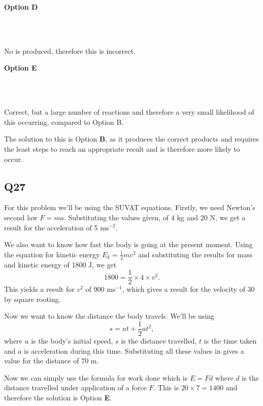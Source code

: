 \documentclass[11pt]{article}
\begin{document}
\textbf{Option D}

\\
\\

No  is produced, therefore this is incorrect.

\textbf{Option E}

 \\
\\

Correct, but a large number of reactions and therefore a very small likelihood of this occurring, compared to Option B.

The solution to this is Option \textbf{B}, as it produces the correct products and requires the least steps to reach an appropriate result and is therefore more likely to occur.


\subsection*{Q27}
For this problem we'll be using the SUVAT equations.  Firstly, we need Newton's second law $F=ma$.  Substituting the values given, of 4 kg and 20 N, we get a result for the acceleration of 5 $\mathrm{ms^{-2}}$.  

We also want to know how fast the body is going at the present moment.  Using the equation for kinetic energy $E_k = \frac{1}{2}mv^2$ and substituting the results for mass and kinetic energy of 1800 J, we get 
\begin{equation*}
1800 = \frac{1}{2} \times 4 \times v^2.
\end{equation*}
This yields a result for $v^2$ of 900 $\mathrm{ms^{-1}}$, which gives a result for the velocity of 30 by square rooting.  

Now we want to know the distance the body travels.  We'll be using
\begin{equation*}
s=ut+\frac{1}{2}at^2,
\end{equation*}
where $u$ is the body's initial speed, $s$ is the distance travelled, $t$ is the time taken and $a$ is acceleration during this time.  Substituting all these values in gives a value for the distance of 70 m.  

Now we can simply use the formula for work done which is $E = Fd$ where $d$ is the distance travelled under application of a force $F$.  This is $20 \times 7 = 1400$ and therefore the solution is Option \textbf{E}.
\end{document}
